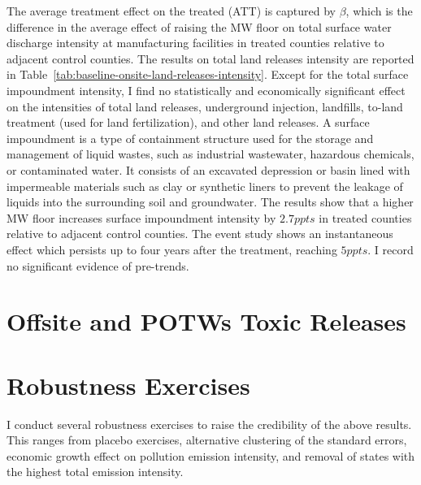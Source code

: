 \documentclass[12pt, english]{article}
\begin{document}
    The average treatment effect on the treated (ATT) is captured by $\beta$, which is the difference in the average effect of raising the MW floor on total surface water discharge intensity at manufacturing facilities in treated counties relative to adjacent control counties. The results on total land releases intensity are reported in Table~\ref{tab:baseline-onsite-land-releases-intensity}. Except for the total surface impoundment intensity, I find no statistically and economically significant effect on the intensities of total land releases, underground injection, landfills, to-land treatment (used for land fertilization), and other land releases. A surface impoundment is a type of containment structure used for the storage and management of liquid wastes, such as industrial wastewater, hazardous chemicals, or contaminated water. It consists of an excavated depression or basin lined with impermeable materials such as clay or synthetic liners to prevent the leakage of liquids into the surrounding soil and groundwater. The results show that a higher MW floor increases surface impoundment intensity by $2.7ppts$ in treated counties relative to adjacent control counties. The event study shows an instantaneous effect which persists up to four years after the treatment, reaching $5ppts$. I record no significant evidence of pre-trends.
    


    \section{Offsite and POTWs Toxic Releases}\label{sec:offsite-and-potws-toxic-releases}
    
    
    


    \section{Robustness Exercises}\label{sec:robustness-exercises}
    I conduct several robustness exercises to raise the credibility of the above results. This ranges from placebo exercises, alternative clustering of the standard errors, economic growth effect on pollution emission intensity, and removal of states with the highest total emission intensity.
\end{document}
